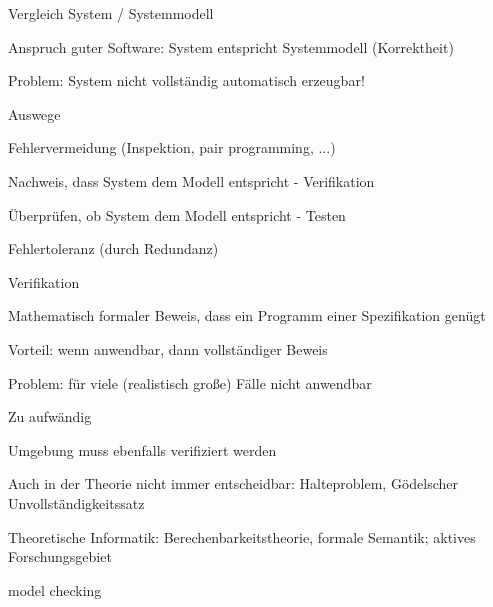 \documentclass[a4paper]{article}
\begin{document}
\begin{multicols}{3}
  Vergleich System / Systemmodell
  \begin{itemize*}
    \item Anspruch guter Software: System entspricht Systemmodell (Korrektheit)
    \item Problem: System nicht vollständig automatisch erzeugbar!
    \item Auswege
    \begin{itemize*}
      \item Fehlervermeidung (Inspektion, pair programming, ...)
      \item Nachweis, dass System dem Modell entspricht - Verifikation
      \item Überprüfen, ob System dem Modell entspricht - Testen
      \item Fehlertoleranz (durch Redundanz)
    \end{itemize*}
  \end{itemize*}

  Verifikation
  \begin{itemize*}
    \item Mathematisch formaler Beweis, dass ein Programm einer Spezifikation genügt
    \item Vorteil: wenn anwendbar, dann vollständiger Beweis
    \item Problem: für viele (realistisch große) Fälle nicht anwendbar
    \begin{itemize*}
      \item Zu aufwändig
      \item Umgebung muss ebenfalls verifiziert werden
      \item Auch in der Theorie nicht immer entscheidbar: Halteproblem, Gödelscher Unvollständigkeitssatz
    \end{itemize*}
    \item Theoretische Informatik: Berechenbarkeitstheorie, formale Semantik; aktives Forschungsgebiet
    \begin{itemize*}
      \item model checking
    \end{itemize*}
  \end{itemize*}


\end{multicols}
\end{document}
